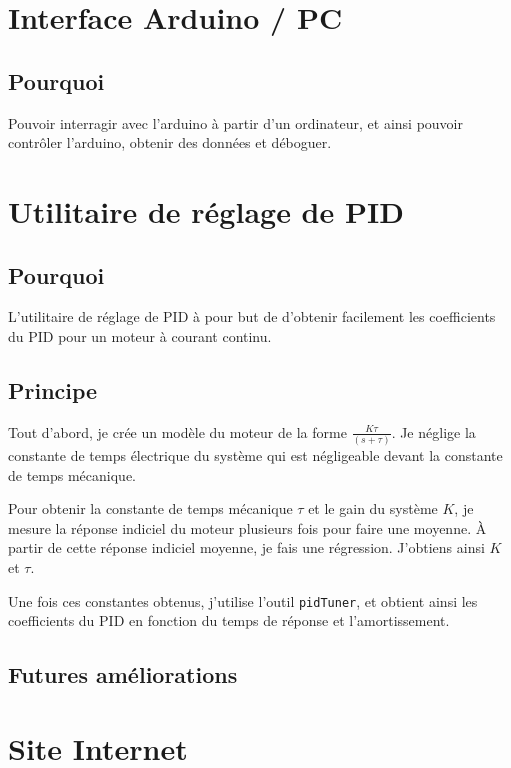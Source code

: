 \documentclass[12pt,a4paper]{report}
\begin{document}
  \section{Interface Arduino / PC}
    \subsection{Pourquoi}
      Pouvoir interragir avec l'arduino à partir d'un ordinateur, et ainsi pouvoir contr\^oler l'arduino, obtenir des données et déboguer.

    \subsection{}

  \section{Utilitaire de réglage de PID}
    \subsection{Pourquoi}
      L'utilitaire de réglage de PID à pour but de d'obtenir facilement les coefficients du PID pour un moteur à courant continu.

    \subsection{Principe}
      Tout d'abord, je crée un modèle du moteur de la forme \(\frac{K\tau}{(s+\tau)}\). Je néglige la constante de temps électrique du système qui est négligeable devant la constante de temps mécanique.

      Pour obtenir la constante de temps mécanique \(\tau \) et le gain du système \(K\), je mesure la réponse indiciel du moteur plusieurs fois pour faire une moyenne. À partir de cette réponse indiciel moyenne, je fais une régression. J'obtiens ainsi \(K\) et \(\tau \).

      Une fois ces constantes obtenus, j'utilise l'outil \texttt{pidTuner}, et obtient ainsi les coefficients du PID en fonction du temps de réponse et l'amortissement.

    \subsection{Futures améliorations}

  \section{Site Internet}
\end{document}
